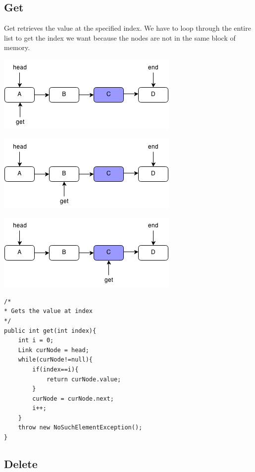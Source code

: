 \documentclass[11pt,oneside]{book}
\makeatletter
\def\maxwidth#1{\ifdim\Gin@nat@width>#1 #1\else\Gin@nat@width\fi}
\makeatother
\begin{document}
\subsection{Get}

Get retrieves the value at the specified index. We have to loop through the entire list to get the index we want because the nodes are not in the same block of memory.

\vspace{5px}\includegraphics[width=\maxwidth{\textwidth}]{linkedlistget.png}

\vspace{5px}\includegraphics[width=\maxwidth{\textwidth}]{linkedlistget2.png}

\vspace{5px}\includegraphics[width=\maxwidth{\textwidth}]{linkedlistget3.png}

\begin{lstlisting}
/*
* Gets the value at index
*/
public int get(int index){
    int i = 0;
    Link curNode = head;
    while(curNode!=null){
        if(index==i){
            return curNode.value;
        }
        curNode = curNode.next;
        i++;
    }
    throw new NoSuchElementException();
}
\end{lstlisting}

\subsection{Delete}
\end{document}
